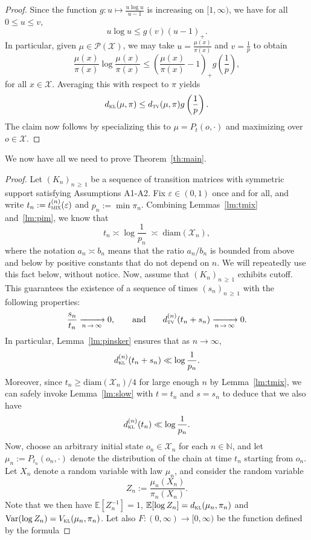 \documentclass[AHL,Unicode,longabstracts,published]{cedram}
\newcommand{\EE}{{\mathbb{E}}}
\newcommand{\N}{\mathbb{N}}
\newcommand{\cX}{\mathcal{X}}
\newcommand{\cP}{\mathcal{P}}
\newcommand{\dtv}{d_{\textsc{tv}}}
\newcommand{\dkl}{d_{\textsc{kl}}}
\newcommand{\vkl}{V_{\textsc{kl}}}
\newcommand{\pim}{p}
\newcommand{\tmix}{t_{\textsc{mix}}}
\newcommand{\diam}{\mathrm{diam}}
\newcommand{\var}{{\mathrm{Var}}}
\begin{document}
\begin{proof}
Since the function $g\colon u \mapsto \frac{u\log u }{u-1}$ is increasing on $[1,\infty)$, we have for all $0\le u\le v$,
\[
u \log u \le g(v)(u-1)_+.
\]
In particular, given $\mu\in\cP(\cX)$, we may take $u=\frac{\mu(x)}{\pi(x)}$ and $v=\frac{1}{\pim}$ to obtain
\[
\frac{\mu(x)}{\pi(x)}\log \frac{\mu(x)}{\pi(x)} \le \left(\frac{\mu(x)}{\pi(x)}-1\right)_+g\left(\frac{1}{\pim}\right),
\]
for all $x\in\cX$. Averaging this with respect to $\pi$ yields
\[
\dkl(\mu,\pi) \le \dtv(\mu,\pi) g\left(\frac{1}{\pim}\right).
\]
The claim now follows by specializing this to $\mu=P_t(o,\cdot)$ and maximizing over $o\in\cX$.
\end{proof}

We now have all we need to prove Theorem~\ref{th:main}.

\begin{proof}
Let $(K_n)_{n\,\ge\,1}$ be a sequence of transition matrices with symmetric support satisfying Assumptions A1-A2. Fix $\varepsilon\in(0,1)$ once and for all, and write $t_n:=\tmix^{(n)}(\varepsilon)$ and $p_n:=\min \pi_n$. Combining Lemmas~\ref{lm:tmix} and~\ref{lm:pim}, we know that
\[
t_n \asymp \log \frac{1}{p_n} \; \asymp \;\diam(\cX_n),
\]
where the notation $a_n\asymp b_n$ means that the ratio $a_n/b_n$ is bounded from above and below by positive constants that do not depend on $n$. We will repeatedly use this fact below, without notice. Now, assume that $(K_n)_{n\,\ge\,1}$ exhibits cutoff. This guarantees the existence of a sequence of times $(s_n)_{n\,\ge\,1}$ with the following properties:
\[
\frac{s_n}{t_n} \xrightarrow[n\,\to\,\infty]{} 0, \qquad \text{and}\qquad \dtv^{(n)}(t_n+s_n) \xrightarrow[n\,\to\,\infty]{} 0.
\]
In particular, Lemma~\ref{lm:pinsker} ensures that as $n\to\infty$,
\[
\dkl^{(n)}(t_n+s_n) \ll \log \frac{1}{p_n}.
\]
Moreover, since $t_n\ge \diam(\cX_n)/4$ for large enough $n$ by Lemma~\ref{lm:tmix}, we can safely invoke Lemma~\ref{lm:slow} with $t=t_n$ and $s=s_n$ to deduce that we also have
\begin{equation}\label{half}
\dkl^{(n)}(t_n) \ll \log \frac{1}{p_n}.
\end{equation}
Now, choose an arbitrary initial state $o_n\in\cX_n$ for each $n\in\N$, and let $\mu_n:=P_{t_n}(o_n,\cdot)$ denote the distribution of the chain at time $t_n$ starting from $o_n$. Let $X_n$ denote a random variable with law $\mu_n$, and consider the random variable
\[
Z_n := \frac{\mu_n(X_n)}{\pi_n(X_n)}.
\]
Note that we then have $\EE[Z_n^{-1}]=1$, $\EE[\log Z_n]=\dkl(\mu_n,\pi_n)$ and $\var(\log Z_n)\linebreak=\vkl(\mu_n,\pi_n)$. Let also $F\colon(0,\infty)\to[0,\infty)$ be the function defined by the formula

\end{proof}
\end{document}

